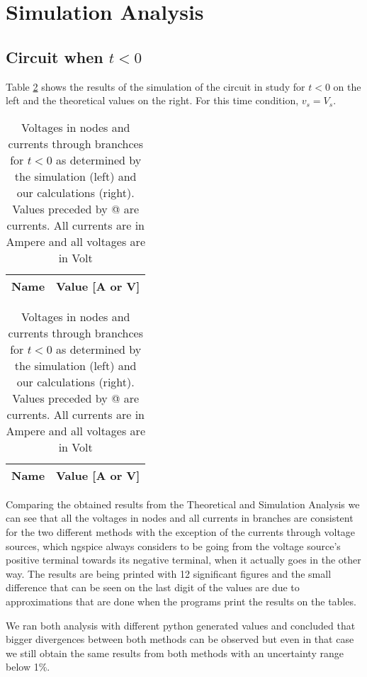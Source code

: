 \section{Simulation Analysis}
\label{sec:simulation}

\subsection{Circuit when $t<0$}

Table \ref{tab:comparison1} shows the results of the simulation of the circuit in study for $t<0$ on the left and the theoretical values on the right. For this time condition, $v_s = V_s$.

\begin{table}[H]
  \centering
  \begin{tabular}{|c|c|}
    \hline    
    {\bf Name} & {\bf Value [A or V]} \\ \hline
    
  \end{tabular}
  \begin{tabular}{|c|c|}
    \hline    
    {\bf Name} & {\bf Value [A or V]} \\ \hline
    
  \end{tabular}
  \caption{Voltages in nodes and currents through branchces for $t<0$ as determined by the simulation (left) and our calculations (right). Values preceded by @ are currents. All currents are in Ampere and all voltages are in Volt}
  \label{tab:comparison1}
\end{table}

Comparing the obtained results from the Theoretical and Simulation Analysis we can see that all the voltages in nodes and all currents in branches are consistent for the two different methods with the exception of the currents through voltage sources, which ngspice always considers to be going from the voltage source's positive terminal towards its negative terminal, when it actually goes in the other way. The results are being printed with 12 significant figures and the small difference that can be seen on the last digit of the values are due to approximations that are done when the programs print the results on the tables.


We ran both analysis with different python generated values and concluded that bigger divergences between both methods can be observed but even in that case we still obtain the same results from both methods with an uncertainty range below 1\%. 

